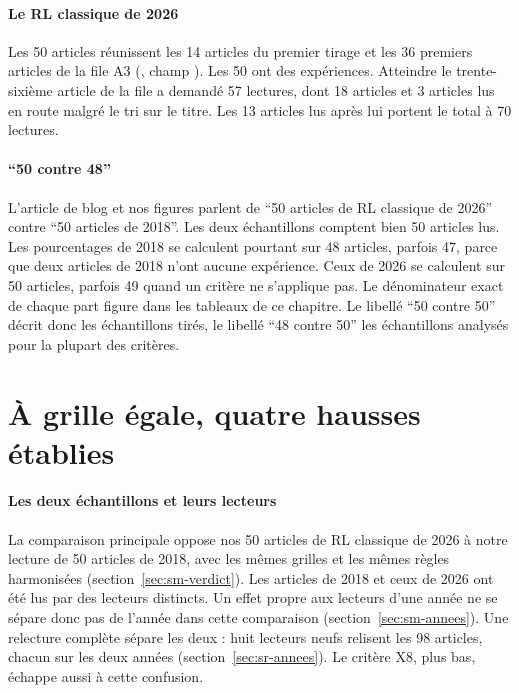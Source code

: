 \paragraph{Le RL classique de 2026}
Les 50 articles réunissent les 14 articles  du premier tirage et les 36 premiers articles
 de la file A3 (, champ ). Les 50 ont des
expériences. Atteindre le trente-sixième article  de la file a demandé 57 lectures, dont 18 articles
 et 3 articles  lus en route malgré le tri sur le titre. Les 13 articles lus
après lui portent le total à 70 lectures.

\paragraph{\enquote{50 contre 48}}
L'article de blog et nos figures parlent de \enquote{50 articles de RL classique de 2026} contre
\enquote{50 articles de 2018}. Les deux échantillons comptent bien 50 articles lus. Les pourcentages de
2018 se calculent pourtant sur 48 articles, parfois 47, parce que deux articles de 2018 n'ont aucune
expérience. Ceux de 2026 se calculent sur 50 articles, parfois 49 quand un critère ne s'applique pas.
Le dénominateur exact de chaque part figure dans les tableaux de ce chapitre. Le libellé \enquote{50
contre 50} décrit donc les échantillons tirés, le libellé \enquote{48 contre 50} les échantillons
analysés pour la plupart des critères.

\section{À grille égale, quatre hausses établies}\label{sec:sr-principale}

\paragraph{Les deux échantillons et leurs lecteurs}
La comparaison principale oppose nos 50 articles de RL classique de 2026 à notre lecture de 50 articles
de 2018, avec les mêmes grilles et les mêmes règles harmonisées (section~\ref{sec:sm-verdict}). Les
articles de 2018 et ceux de 2026 ont été lus par des lecteurs distincts. Un effet propre aux lecteurs
d'une année ne se sépare donc pas de l'année dans cette comparaison (section~\ref{sec:sm-annees}). Une
relecture complète sépare les deux : huit lecteurs neufs relisent les 98 articles, chacun sur les deux
années (section~\ref{sec:sr-annees}). Le critère X8, plus bas, échappe aussi à cette confusion.

